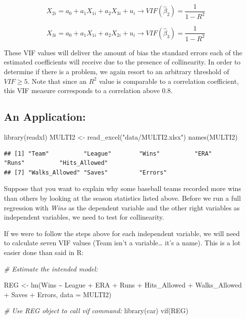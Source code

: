 \documentclass[
]{book}
\newenvironment{Shaded}{\begin{snugshade}}{\end{snugshade}}
\newcommand{\AttributeTok}[1]{\textcolor[rgb]{0.77,0.63,0.00}{#1}}
\newcommand{\CommentTok}[1]{\textcolor[rgb]{0.56,0.35,0.01}{\textit{#1}}}
\newcommand{\FunctionTok}[1]{\textcolor[rgb]{0.00,0.00,0.00}{#1}}
\newcommand{\NormalTok}[1]{#1}
\newcommand{\OtherTok}[1]{\textcolor[rgb]{0.56,0.35,0.01}{#1}}
\newcommand{\SpecialCharTok}[1]{\textcolor[rgb]{0.00,0.00,0.00}{#1}}
\newcommand{\StringTok}[1]{\textcolor[rgb]{0.31,0.60,0.02}{#1}}
\begin{document}
\[X_{2i} = a_0 + a_1 X_{1i} + a_2 X_{3i} + u_i \rightarrow VIF(\hat{\beta}_2) = \frac{1}{1-R^2}\]

\[X_{3i} = a_0 + a_1 X_{1i} + a_2 X_{2i} + u_i \rightarrow VIF(\hat{\beta}_3) = \frac{1}{1-R^2}\]

These VIF values will deliver the amount of bias the standard errors each of the estimated coefficients will receive due to the presence of collinearity. In order to determine if there is a problem, we again resort to an arbitrary threshold of \(VIF \geq 5\). Note that since an \(R^2\) value is comparable to a correlation coefficient, this VIF measure corresponds to a correlation above 0.8.

\hypertarget{an-application-2}{%
\subsection{An Application:}\label{an-application-2}}

\begin{Shaded}
\begin{Highlighting}[]
\FunctionTok{library}\NormalTok{(readxl)}
\NormalTok{MULTI2 }\OtherTok{\textless{}{-}} \FunctionTok{read\_excel}\NormalTok{(}\StringTok{"data/MULTI2.xlsx"}\NormalTok{)}
\FunctionTok{names}\NormalTok{(MULTI2)}
\end{Highlighting}
\end{Shaded}

\begin{verbatim}
## [1] "Team"          "League"        "Wins"          "ERA"           "Runs"          "Hits_Allowed" 
## [7] "Walks_Allowed" "Saves"         "Errors"
\end{verbatim}

Suppose that you want to explain why some baseball teams recorded more wins than others by looking at the season statistics listed above. Before we run a full regression with \emph{Wins} as the dependent variable and the other right variables as independent variables, we need to test for collinearity.

If we were to follow the steps above for each independent variable, we will need to calculate seven VIF values (Team isn't a variable\ldots{} it's a name). This is a lot easier done than said in R:

\begin{Shaded}
\begin{Highlighting}[]
\CommentTok{\# Estimate the \textquotesingle{}intended\textquotesingle{} model:}

\NormalTok{REG }\OtherTok{\textless{}{-}} \FunctionTok{lm}\NormalTok{(Wins }\SpecialCharTok{\textasciitilde{}}\NormalTok{ League }\SpecialCharTok{+}\NormalTok{ ERA }\SpecialCharTok{+}\NormalTok{ Runs }\SpecialCharTok{+}\NormalTok{ Hits\_Allowed }\SpecialCharTok{+}\NormalTok{ Walks\_Allowed }\SpecialCharTok{+}\NormalTok{ Saves }\SpecialCharTok{+}\NormalTok{ Errors, }\AttributeTok{data =}\NormalTok{ MULTI2)}

\CommentTok{\# Use REG object to call vif command:}
\FunctionTok{library}\NormalTok{(car)}
\FunctionTok{vif}\NormalTok{(REG)}
\end{Highlighting}
\end{Shaded}
\end{document}
